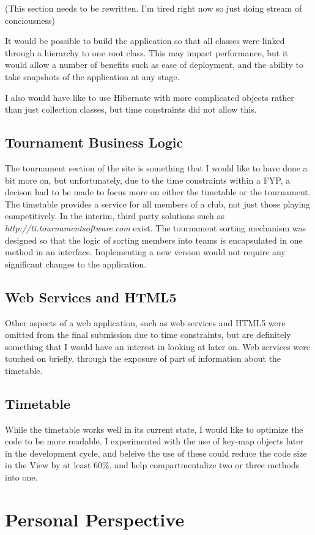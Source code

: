 (This section needs to be rewritten. I'm tired right now so just doing stream of conciousness) 

It would be possible to build the application so that all classes were linked through a hierarchy to one root class. This may impact performance, but it would allow a number of benefits such as ease of deployment, and the ability to take snapshots of the application at any stage.

I also would have like to use Hibernate with more complicated objects rather than just collection classes, but time constraints did not allow this.

\subsection{Tournament Business Logic}

The tournament section of the site is something that I would like to have done a bit more on, but unfortunately, due to the time constraints within a FYP, a decison had to be made to focus more on either the timetable or the tournament. The timetable provides a service for all members of a club, not just those playing competitively. In the interim, third party solutions such as \textit{http://ti.tournamentsoftware.com} exist. The tournament sorting mechanism was designed so that the logic of sorting members into teams is encapsulated in one method in an interface. Implementing a new version would not require any significant changes to the application. 

\subsection{Web Services and HTML5}
Other aspects of a web application, such as web services and HTML5 were omitted from the final submission due to time constraints, but are definitely something that I would have an interest in looking at later on. Web services were touched on briefly, through the exposure of part of information about the timetable. 

\subsection{Timetable}
While the timetable works well in its current state, I would like to optimize the code to be more readable. I experimented with the use of key-map objects later in the development cycle, and beleive the use of these could reduce the code size in the View by at least 60\%, and help compartmentalize two or three methods into one.

\section{Personal Perspective}